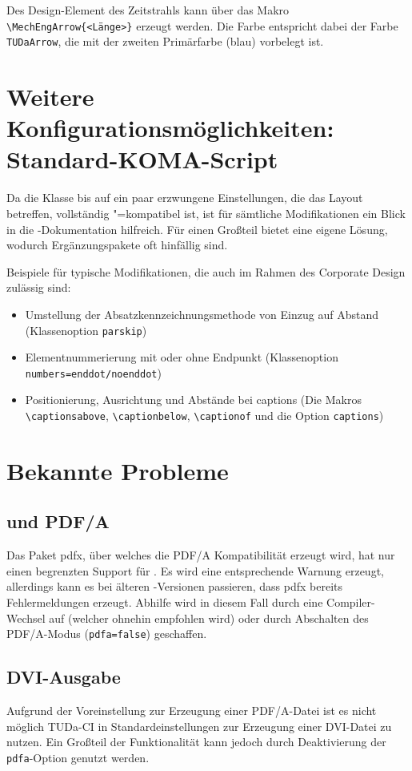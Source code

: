\documentclass[
	german,%
	accentcolor=9c,%
]{tudapub}
\newcommand*{\code}[1]{\texttt{#1}}
\newcommand*{\pkg}[1]{\textsf{#1}}
\begin{document}
Des Design-Element des Zeitstrahls kann über das Makro \verb+\MechEngArrow{<Länge>}+ erzeugt werden. Die Farbe entspricht dabei der Farbe \code{TUDaArrow}, die mit der zweiten Primärfarbe (blau) vorbelegt ist.

\section{Weitere Konfigurationsmöglichkeiten: Standard-KOMA-Script}
\label{sec:KOMA}
Da die Klasse bis auf ein paar erzwungene Einstellungen, die das Layout betreffen, vollständig \KOMAScript"=kompatibel ist, ist für sämtliche Modifikationen ein Blick in die \KOMAScript-Dokumentation hilfreich. Für einen Großteil bietet \KOMAScript{} eine eigene Lösung, wodurch Ergänzungspakete oft hinfällig sind.

Beispiele für typische Modifikationen, die auch im Rahmen des Corporate Design zulässig sind:
\begin{itemize}
	\item Umstellung der Absatzkennzeichnungsmethode von Einzug auf Abstand (Klassenoption \verb+parskip+)
	\item Elementnummerierung mit oder ohne Endpunkt (Klassenoption \verb+numbers=enddot/noenddot+)
	\item Positionierung, Ausrichtung und Abstände bei captions (Die Makros \verb+\captionsabove+, \verb+\captionbelow+, \verb+\captionof+ und die Option \verb+captions+)
\end{itemize}

\section{Bekannte Probleme}

\subsection{\texorpdfstring{}{XeLaTeX} und PDF/A}
Das Paket \pkg{pdfx}, über welches die PDF/A Kompatibilität erzeugt wird, hat nur einen begrenzten Support für .
Es wird eine entsprechende Warnung erzeugt, allerdings kann es bei älteren -Versionen passieren, dass \pkg{pdfx} bereits Fehlermeldungen erzeugt. Abhilfe wird in diesem Fall durch eine Compiler-Wechsel auf  (welcher ohnehin empfohlen wird) oder durch Abschalten des PDF/A-Modus (\code{pdfa=false})  geschaffen.

\subsection{DVI-Ausgabe}
Aufgrund der Voreinstellung zur Erzeugung einer PDF/A-Datei ist es nicht möglich TUDa-CI in Standardeinstellungen zur Erzeugung einer DVI-Datei zu nutzen. Ein Großteil der Funktionalität kann jedoch durch Deaktivierung der \code{pdfa}-Option genutzt werden.
\end{document}
